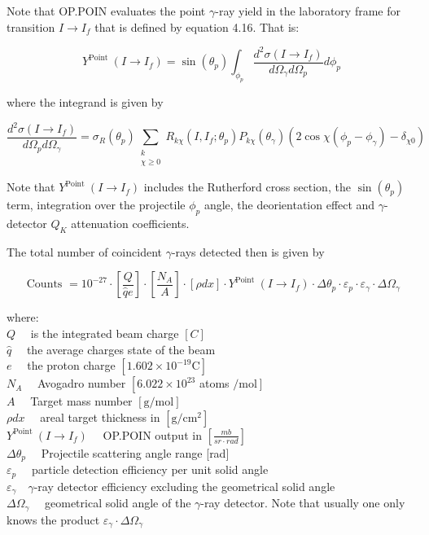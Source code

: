 \documentclass[10pt]{article}
\begin{document}
Note that OP.POIN evaluates the point $\gamma$-ray yield in the laboratory frame for transition $I \rightarrow I_{f}$ that is defined by equation 4.16. That is:


\begin{equation*}
Y^{\text {Point }}\left(I \rightarrow I_{f}\right)=\sin \left(\theta_{p}\right) \int_{\phi_{p}} \frac{d^{2} \sigma\left(I \rightarrow I_{f}\right)}{d \Omega_{\gamma} d \Omega_{p}} d \phi_{p} \tag{6.38}
\end{equation*}


where the integrand is given by


\begin{equation*}
\frac{d^{2} \sigma\left(I \rightarrow I_{f}\right)}{d \Omega_{p} d \Omega_{\gamma}}=\sigma_{R}\left(\theta_{p}\right) \sum_{\substack{k \\ \chi \geq 0}} R_{k \chi}\left(I, I_{f} ; \theta_{p}\right) P_{k \chi}\left(\theta_{\gamma}\right)\left(2 \cos \chi\left(\phi_{p}-\phi_{\gamma}\right)-\delta_{\chi 0}\right) \tag{6.35}
\end{equation*}


Note that $Y^{\text {Point }}\left(I \rightarrow I_{f}\right)$ includes the Rutherford cross section, the $\sin \left(\theta_{p}\right)$ term, integration over the projectile $\phi_{p}$ angle, the deorientation effect and $\gamma$-detector $Q_{K}$ attenuation coefficients.

The total number of coincident $\gamma$-rays detected then is given by

$$
\text { Counts }=10^{-27} \cdot\left[\frac{Q}{\hat{q} e}\right] \cdot\left[\frac{N_{A}}{A}\right] \cdot[\rho d x] \cdot Y^{\text {Point }}\left(I \rightarrow I_{f}\right) \cdot \Delta \theta_{p} \cdot \varepsilon_{p} \cdot \varepsilon_{\gamma} \cdot \Delta \Omega_{\gamma}
$$

where:\\
$Q \quad$ is the integrated beam charge $[C]$\\
$\hat{q} \quad$ the average charges state of the beam\\
$e \quad$ the proton charge $\left[1.602 \times 10^{-19} \mathrm{C}\right]$\\
$N_{A} \quad$ Avogadro number $\left[6.022 \times 10^{23}\right.$ atoms $\left./ \mathrm{mol}\right]$\\
$A \quad$ Target mass number $[\mathrm{g} / \mathrm{mol}]$\\
$\rho d x \quad$ areal target thickness in $\left[\mathrm{g} / \mathrm{cm}^{2}\right]$\\
$Y^{\text {Point }}\left(I \rightarrow I_{f}\right) \quad$ OP.POIN output in $\left[\frac{m b}{s r \cdot r a d}\right]$\\
$\Delta \theta_{p} \quad$ Projectile scattering angle range [rad]\\
$\varepsilon_{p} \quad$ particle detection efficiency per unit solid angle\\
$\varepsilon_{\gamma} \quad \gamma$-ray detector efficiency excluding the geometrical solid angle\\
$\Delta \Omega_{\gamma} \quad$ geometrical solid angle of the $\gamma$-ray detector. Note that usually one only knows the product $\varepsilon_{\gamma} \cdot \Delta \Omega_{\gamma}$
\end{document}
